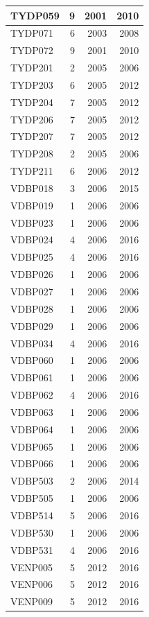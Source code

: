\documentclass[11pt,]{book}
\begin{document}
\begin{table}
\begin{tabular}[t]{l|r|r|r}
\hline
TYDP059 & 9 & 2001 & 2010\\
\hline
TYDP071 & 6 & 2003 & 2008\\
\hline
TYDP072 & 9 & 2001 & 2010\\
\hline
TYDP201 & 2 & 2005 & 2006\\
\hline
TYDP203 & 6 & 2005 & 2012\\
\hline
TYDP204 & 7 & 2005 & 2012\\
\hline
TYDP206 & 7 & 2005 & 2012\\
\hline
TYDP207 & 7 & 2005 & 2012\\
\hline
TYDP208 & 2 & 2005 & 2006\\
\hline
TYDP211 & 6 & 2006 & 2012\\
\hline
VDBP018 & 3 & 2006 & 2015\\
\hline
VDBP019 & 1 & 2006 & 2006\\
\hline
VDBP023 & 1 & 2006 & 2006\\
\hline
VDBP024 & 4 & 2006 & 2016\\
\hline
VDBP025 & 4 & 2006 & 2016\\
\hline
VDBP026 & 1 & 2006 & 2006\\
\hline
VDBP027 & 1 & 2006 & 2006\\
\hline
VDBP028 & 1 & 2006 & 2006\\
\hline
VDBP029 & 1 & 2006 & 2006\\
\hline
VDBP034 & 4 & 2006 & 2016\\
\hline
VDBP060 & 1 & 2006 & 2006\\
\hline
VDBP061 & 1 & 2006 & 2006\\
\hline
VDBP062 & 4 & 2006 & 2016\\
\hline
VDBP063 & 1 & 2006 & 2006\\
\hline
VDBP064 & 1 & 2006 & 2006\\
\hline
VDBP065 & 1 & 2006 & 2006\\
\hline
VDBP066 & 1 & 2006 & 2006\\
\hline
VDBP503 & 2 & 2006 & 2014\\
\hline
VDBP505 & 1 & 2006 & 2006\\
\hline
VDBP514 & 5 & 2006 & 2016\\
\hline
VDBP530 & 1 & 2006 & 2006\\
\hline
VDBP531 & 4 & 2006 & 2016\\
\hline
VENP005 & 5 & 2012 & 2016\\
\hline
VENP006 & 5 & 2012 & 2016\\
\hline
VENP009 & 5 & 2012 & 2016\\

\end{tabular}
\end{table}
\end{document}
